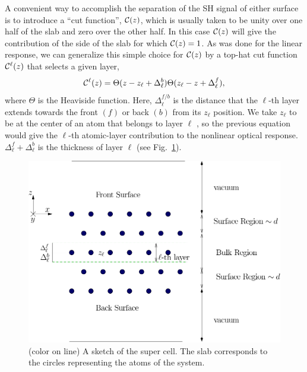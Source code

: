 \documentclass[floatfix,prb,aps,superscriptaddress,11pt,preprint,letterpaper]{revtex4}
\def\chon{black}
\begin{document}
A convenient way to accomplish the separation of the SH signal of
either surface is to introduce a ``cut function'', ${\mathbf{\cal C}}(z)$, which is 
usually taken to be unity over one half of the slab and zero over 
the other half.\cite{reiningPRB94}
In this case ${\mathbf{\cal C}}(z)$ will give the contribution of the 
side of the slab for which ${\mathbf{\cal C}}(z)=1$. 
As was done for the linear response,\cite{mendozaPRB06}
we can generalize this 
simple choice for ${\mathbf{\cal C}}(z)$ by a top-hat cut function
${\mathbf{\cal C}}^\ell(z)$ that selects a given layer,
\begin{equation}
\label{sz}
{\mathbf{\cal C}}^\ell(z)=\Theta(z-z_\ell+\Delta_\ell^{b})  
            \Theta(z_\ell-z+\Delta_\ell^f),
\end{equation} 
where $\Theta$ is the Heaviside function. Here, $\Delta_\ell^{f/b}$
is the distance that the $\ell$-th layer extends towards the front
$(f)$ or back $(b)$ from its $z_\ell$ position. 
We take $z_\ell$ {\color{\chon} to be} at the center of an atom that 
belongs to layer $\ell${\color{\chon} , so the previous} 
equation would give the $\ell$-th atomic-layer 
contribution to the {\color{\chon} nonlinear} optical response.
$\Delta_\ell^f+\Delta_\ell^b$ is the thickness of layer $\ell$ 
(see Fig.~\ref{fslab}).
\begin{figure}
\centering
\includegraphics[scale=.7]{images/slab}
\caption{(color on line) A sketch of the super {\color{\chon} cell. 
The} slab corresponds to the
circles representing the atoms of the system.\label{fslab}} 
\end{figure}
\end{document}
